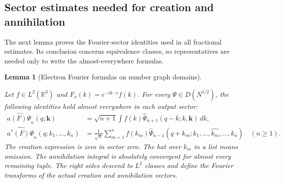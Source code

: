 \documentclass[11pt,a4paper]{article}
\newtheorem{lemma}[theorem]{Lemma}
\theoremstyle{definition}
\theoremstyle{remark}
\newcommand{\proofid}[1]{\par\smallskip{\normalfont\scriptsize\color{inkblue}Stable ID: \nolinkurl{#1}}\par\smallskip}
\begin{document}
\subsection{Sector estimates needed for creation and annihilation}

The next lemma proves the Fourier-sector identities used in all
fractional estimates. Its conclusion concerns equivalence classes,
so representatives are needed only to write the almost-everywhere
formulas.

\begin{lemma}[Electron Fourier formulas on number graph domains]
\label{reg:sector-fourier}
\proofid{reg:sector-fourier}
\par{}\par\smallskip

Let \(f\in L^2(\mathbb R^3)\) and
\(F_x(k)=e^{-ik\cdot x}f(k)\). For every
\(\Psi\in D(N^{1/2})\), the following identities hold almost
everywhere in each output sector:
\begin{align}
 \widehat{a(F)\Psi}_n(q;\mathbf k)
 &=\sqrt{n+1}\int\overline{f(k)}
      \widehat\Psi_{n+1}(q-k;k,\mathbf k)\,dk,
 \label{reg:a-fourier}\\
 \widehat{a^*(F)\Psi}_n(q;k_1,\ldots,k_n)
 &=\frac1{\sqrt n}\sum_{m=1}^n f(k_m)
       \widehat\Psi_{n-1}(q+k_m;k_1,\ldots,\widehat{k_m},\ldots,k_n)
       \quad(n\geq1).
 \label{reg:astar-fourier}
\end{align}
The creation expression is zero in sector zero. The hat over \(k_m\)
in a list means omission. The annihilation integral is absolutely
convergent for almost every remaining tuple. The right sides descend
to \(L^2\) classes and define the Fourier transforms of the actual
creation and annihilation vectors.
\end{lemma}
\end{document}
